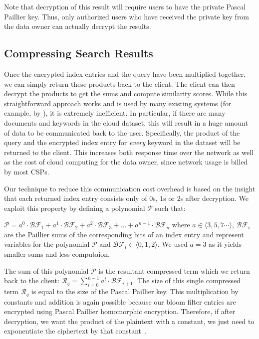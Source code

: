 Note that decryption of this result will require users to have the private Pascal 
Paillier key. Thus, only authorized users who have received the private key from the
data owner can actually decrypt the results.

\subsection{Compressing Search Results}

Once the encrypted index entries and the query have been multiplied together, 
we can simply return these products back to the client. The client can then decrypt the products to get the
sums and compute similarity scores. While this straightforward approach works and
is used by many existing systems (for example, by \cite{zeehan}), it is extremely
inefficient.
In particular, if there are many documents and keywords in the cloud dataset, this
will result in a huge amount of data to be communicated back to the user. Specifically,
the product of the query and the encrypted index entry for \textit{every} keyword in the dataset will be returned
to the client. This increases both response time over the network as well as
the cost of cloud computing for the data owner, since network usage is billed
by most CSPs.

Our technique to reduce this communication cost overhead is based on the insight that each returned
index entry consists only of $0$s, $1$s or $2$s after decryption. We exploit this
property by 
defining a polynomial $\mathcal{P}$ such that:

$
\mathcal{P} = {a}^0\cdot\mathcal{BF}_1 + {a}^1\cdot\mathcal{BF}_2 +
{a}^2\cdot\mathcal{BF}_3 + \ldots + {a}^{n-1}\cdot\mathcal{BF}_n
$
\newline
where ${a} \in \langle 3,5,7 \cdots \rangle $, $\mathcal{BF}_i$  are the
Paillier sums of the corresponding bits of an index entry and represent variables for
the polynomial $\mathcal{P}$ and $\mathcal{BF}_i \in \langle 0,1,2 \rangle $. We
used ${a}=3$ as it yields smaller sums and less computaion.

The sum of this polynomial $\mathcal{P}$ is the resultant compressed term which we return back
to the client:
$
\mathcal{R}_q = \sum_{i=0}^{n-1} {a}^{i}\cdot\mathcal{BF}_{i+1}
$.
The size of this single compressed term $\mathcal{R}_q$
is equal to the size of the Pascal Paillier key. 
This multiplication by constants and addition is again possible 
because our bloom filter entries are encrypted using Pascal Paillier homomorphic
encryption. Therefore, if after decryption, we want the product of the plaintext with a constant, we
just need to exponentiate the ciphertext by that constant~\cite{pascal}.

